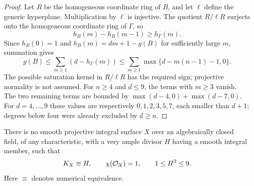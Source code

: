 \begin{proof}
Let $R$ be the homogeneous coordinate ring of $B$, and let
$\ell$ define the generic hyperplane. Multiplication by
$\ell$ is injective. The quotient $R/\ell R$ surjects onto
the homogeneous coordinate ring of $\Gamma$, so
\[
 h_B(m)-h_B(m-1)\geq h_\Gamma(m).
\]
Since $h_B(0)=1$ and $h_B(m)=dm+1-g(B)$ for sufficiently
large $m$, summation gives
\[
 g(B)\leq\sum_{m\geq1}(d-h_\Gamma(m))
 \leq\sum_{m\geq1}\max\{d-m(n-1)-1,0\}.
\]
The possible saturation kernel in $R/\ell R$ has the required
sign; projective normality is not assumed. For $n\geq4$ and
$d\leq9$, the terms with $m\geq3$ vanish. The two remaining
terms are bounded by $\max(d-4,0)+\max(d-7,0)$.
For $d=4,\ldots,9$ these values are respectively
$0,1,2,3,5,7$, each smaller than $d+1$; degrees below four
were already excluded by $d\geq n$.
\end{proof}

\begin{proposition}\label{prop:very-ample-numerical-obstruction}
There is no smooth projective integral surface $X$ over an
algebraically closed field, of any characteristic, with a very
ample divisor $H$ having a smooth integral member, such that
\[
 K_X\equiv H,\qquad \chi(\mathcal O_X)=1,
 \qquad 1\leq H^2\leq9.
\]
Here $\equiv$ denotes numerical equivalence.
\end{proposition}

